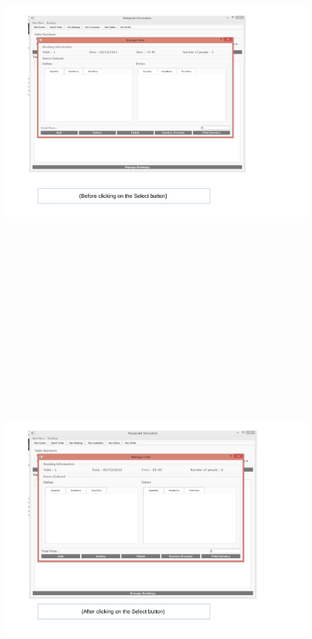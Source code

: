 \begin{landscape}
\begin{figure}[H]
    \includegraphics[height = 15cm]{./Maintenance/images/screen15}
    \caption{} \label{fig:screen15}
\end{figure}

\begin{figure}[H]
    \includegraphics[height = 15cm]{./Maintenance/images/screen16}
    \caption{} \label{fig:screen16}
\end{figure}


\end{landscape}

